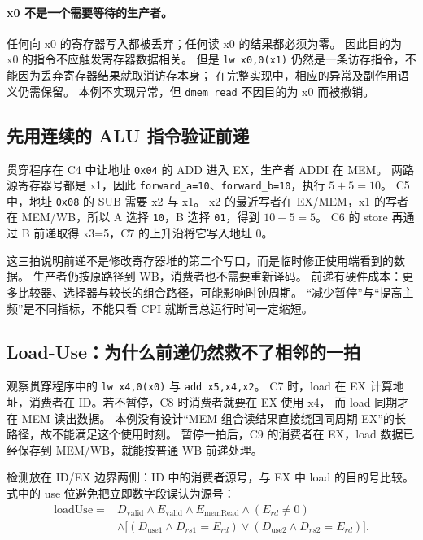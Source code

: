 \paragraph{x0 不是一个需要等待的生产者。}
任何向 x0 的寄存器写入都被丢弃；任何读 x0 的结果都必须为零。
因此目的为 x0 的指令不应触发寄存器数据相关。
但是 \texttt{lw x0,0(x1)} 仍然是一条访存指令，不能因为丢弃寄存器结果就取消访存本身；
在完整实现中，相应的异常及副作用语义仍需保留\cite{ch4-rv32i}。
本例不实现异常，但 \texttt{dmem\_read} 不因目的为 x0 而被撤销。

\subsection{先用连续的 ALU 指令验证前递}

贯穿程序在 C4 中让地址 \texttt{0x04} 的 ADD 进入 EX，生产者 ADDI 在 MEM。
两路源寄存器号都是 x1，因此 \texttt{forward\_a=10}、\texttt{forward\_b=10}，执行 \(5+5=10\)。
C5 中，地址 \texttt{0x08} 的 SUB 需要 x2 与 x1。
x2 的最近写者在 EX/MEM，x1 的写者在 MEM/WB，所以 A 选择 \texttt{10}，B 选择 \texttt{01}，得到 \(10-5=5\)。
C6 的 store 再通过 B 前递取得 x3=5，C7 的上升沿将它写入地址 0。

这三拍说明前递不是修改寄存器堆的第二个写口，而是临时修正使用端看到的数据。
生产者仍按原路径到 WB，消费者也不需要重新译码。
前递有硬件成本：更多比较器、选择器与较长的组合路径，可能影响时钟周期。
“减少暂停”与“提高主频”是不同指标，不能只看 CPI 就断言总运行时间一定缩短。

\subsection{Load-Use：为什么前递仍然救不了相邻的一拍}

观察贯穿程序中的 \texttt{lw x4,0(x0)} 与 \texttt{add x5,x4,x2}。
C7 时，load 在 EX 计算地址，消费者在 ID。若不暂停，C8 时消费者就要在 EX 使用 x4，
而 load 同期才在 MEM 读出数据。
本例没有设计“MEM 组合读结果直接绕回同周期 EX”的长路径，故不能满足这个使用时刻。
暂停一拍后，C9 的消费者在 EX，load 数据已经保存到 MEM/WB，就能按普通 WB 前递处理。

检测放在 ID/EX 边界两侧：ID 中的消费者源号，与 EX 中 load 的目的号比较。
式中的 use 位避免把立即数字段误认为源号：
\begin{align*}
\mathrm{loadUse}={}&D_{\mathrm{valid}}\land E_{\mathrm{valid}}
 \land E_{\mathrm{memRead}}\land(E_{rd}\ne0)\\
 &\land\big[(D_{\mathrm{use1}}\land D_{rs1}=E_{rd})
 \lor(D_{\mathrm{use2}}\land D_{rs2}=E_{rd})\big].
\end{align*}

